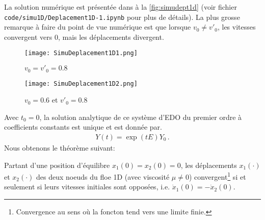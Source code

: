 La solution numérique est présentée dans à la \cref{fig:simudept1d} (voir fichier \verb|code/simu1D/Deplacement1D-1.ipynb| pour plus de détails). La plus grosse remarque à faire du point de vue numérique est que lorsque $v_0 \neq v'_0$, les vitesses convergent vers $0$, mais les déplacements divergent.
\begin{figure*}[!h]
    \centering

    \begin{subfigure}[t]{0.45\textwidth}
        \centering
        \texttt{[image: SimuDeplacement1D1.png]}
        \caption{$v_0=v'_0 = 0.8$}
    \end{subfigure}
    \begin{subfigure}[t]{0.45\textwidth}
        \centering
        \texttt{[image: SimuDeplacement1D2.png]}
        \caption{$v_0= 0.6$ et $v'_0 = 0.8$}
    \end{subfigure}

    \caption{Simulation du déplacement 1D d'un floe avec $m=1$, $k=18$, $\mu=1.3$, $t_{f}=5$. En règle générale, on observe le ralentissement du système et une convergence des déplacements vers l'état d'équilibre $Y_{eq}= (0,0,0,0)$ lorsque $v_0 = v'_0$.}
    \label{fig:simudept1d}
\end{figure*}

Avec $t_0= 0$, la solution analytique de ce système d'EDO du premier ordre à coefficients constants est unique et est donnée par.
\begin{align}
    Y(t) = \exp(tE)Y_0 \,.
\end{align}
Nous obtenons le théorème suivant:
\begin{theorem} \label{th:div1D}
    Partant d'une position d'équilibre $x_1(0) = x_2(0) = 0$, les déplacements $x_1(\cdot)$ et $x_2(\cdot)$ des deux noeuds du floe 1D (avec viscosité $\mu \neq 0$) convergent\footnote{Convergence au sens où la foncton tend vers une limite finie.} si et seulement si leurs vitesses initiales sont opposées, i.e. $\dot x_1(0) = - \dot x_2(0)$.
\end{theorem}

